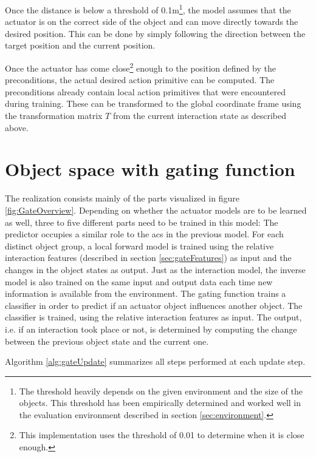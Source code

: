 Once the distance is below a threshold of 0.1m\footnote{The threshold heavily depends on the given environment and the size of the objects. This threshold has been empirically determined and worked well in the evaluation environment described in section \ref{sec:environment}.}, the model assumes that the actuator is on the correct side of the object and can move directly towards the desired position. This can be done by simply following the direction between the target position and the current position.

Once the actuator has come close\footnote{This implementation uses the threshold of 0.01 to determine when it is close enough.} enough to the position defined by the preconditions, the actual desired action primitive can be computed. The preconditions already contain local action primitives that were encountered during training. These can be transformed to the global coordinate frame using the transformation matrix $T$ from the current interaction state as described above. 


\section{Object space with gating function \label{sec:gateRealization}}

The realization consists mainly of the parts visualized in figure \ref{fig:GateOverview}. 
Depending on whether the actuator models are to be learned as well, three to five different parts need to be trained in this model: The predictor occupies a similar role to the \glspl{ac} in the previous model. For each distinct object group, a local forward model is trained using the relative interaction features (described in section \ref{sec:gateFeatures}) as input and the changes in the object states as output. Just as the interaction model, the inverse model is also trained on the same input and output data each time new information is available from the environment. 
The gating function trains a classifier in order to predict if an actuator object influences another object. The classifier is trained, using the relative interaction features as input. The output, i.e. if an interaction took place or not, is determined by computing the change between the previous object state and the current one.

Algorithm \ref{alg:gateUpdate} summarizes all steps performed at each update step.

